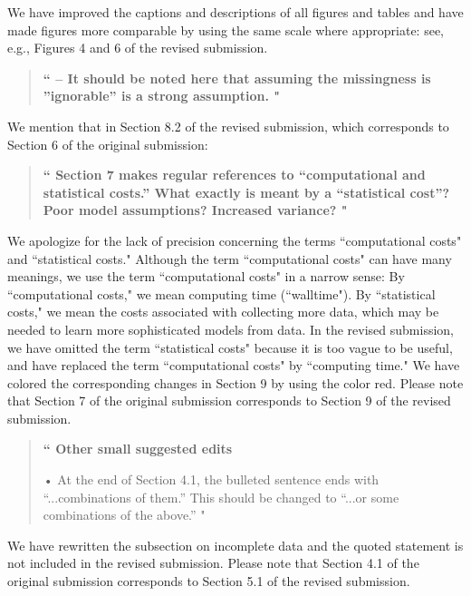 \documentclass[12pt]{article}
\renewcommand{\=}{&=&}
\renewcommand{\bbq}{\vspace{.05cm}\begin{quote}\bf``}
\renewcommand{\ebq}{\hspace{-.15cm}"\end{quote}}
\newcommand{\bauthq}{\vspace{.05cm}\begin{quote}\em}
\newcommand{\eauthq}{\hspace{-.25cm}\end{quote}}
\renewcommand{\=}{&=&}
\begin{document}
We have improved the captions and descriptions of all figures and tables and have made figures more comparable by using the same scale where appropriate:
see, 
e.g.,
Figures 4 and 6 of the revised submission.

\bbq
– It should be noted here that assuming the missingness is ”ignorable” is a strong assumption.
\ebq

We mention that in Section 8.2 of the revised submission,
which corresponds to Section 6 of the original submission:
\bauthq

\eauthq

\vspace{-.25cm}

\bbq
Section 7 makes regular references to “computational and statistical costs.” What exactly is meant by a “statistical cost”? Poor model assumptions? Increased variance?
\ebq

We apologize for the lack of precision concerning the terms ``computational costs" and ``statistical costs."
Although the term ``computational costs" can have many meanings,
we use the term ``computational costs" in a narrow sense:
By ``computational costs,"
we mean computing time (``walltime").
By ``statistical costs,"
we mean the costs associated with collecting more data,
which may be needed to learn more sophisticated models from data.
In the revised submission,
we have omitted the term ``statistical costs" because it is too vague to be useful,
and have replaced the term ``computational costs" by ``computing time."
We have colored the corresponding changes in Section 9 by using the color red.
Please note that Section 7 of the original submission corresponds to Section 9 of the revised submission.

\bbq
Other small suggested edits

• At the end of Section 4.1, the bulleted sentence ends with “...combinations of them.” This should be changed to “...or some combinations of the above.”
\ebq

We have rewritten the subsection on incomplete data and the quoted statement is not included in the revised submission.
Please note that Section 4.1 of the original submission corresponds to Section 5.1 of the revised submission.





\thispagestyle{empty}
\end{document}
